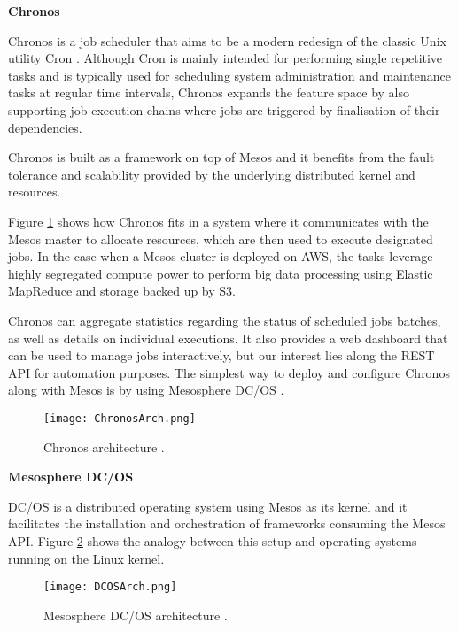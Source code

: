 \vspace{4mm}
\textbf{Chronos}		
\vspace{1mm}
 
Chronos \cite{Chronos} is a job scheduler that aims to be a modern redesign of the classic Unix utility Cron \cite{Cron}. Although Cron is mainly intended for performing single repetitive tasks and is typically used for scheduling system administration and maintenance tasks at regular time intervals, Chronos expands the feature space by also supporting job execution chains where jobs are triggered by finalisation of their dependencies. 

Chronos is built as a framework on top of Mesos and it benefits from the fault tolerance and scalability provided by the underlying distributed kernel and resources.

Figure \ref{ChronosArch} shows how Chronos fits in a system where it communicates with the Mesos master to allocate resources, which are then used to execute designated jobs. In the case when a Mesos cluster is deployed on AWS, the tasks leverage highly segregated compute power to perform big data processing using Elastic MapReduce \cite{EMR} and storage backed up by S3.

Chronos can aggregate statistics regarding the status of scheduled jobs batches, as well as details on individual executions. It also provides a web dashboard that can be used to manage jobs interactively, but our interest lies along the REST API for automation purposes. The simplest way to deploy and configure Chronos along with Mesos is by using Mesosphere DC/OS \cite{DCOS}.

\begin{figure}[H]
	\centering
		\texttt{[image: ChronosArch.png]}
	\caption{Chronos architecture \cite{Chronos}.}
	\label{ChronosArch}
\end{figure}

\textbf{Mesosphere DC/OS}
\vspace{1mm}
 
DC/OS is a distributed operating system using Mesos as its kernel and it facilitates the installation and orchestration of frameworks consuming the Mesos API. Figure \ref{DCOSArch} shows the analogy between this setup and operating systems running on the Linux kernel.

\begin{figure}[h]
	\centering
		\texttt{[image: DCOSArch.png]}
	\caption{Mesosphere DC/OS architecture \cite{DCOS}.}
	\label{DCOSArch}
\end{figure}

